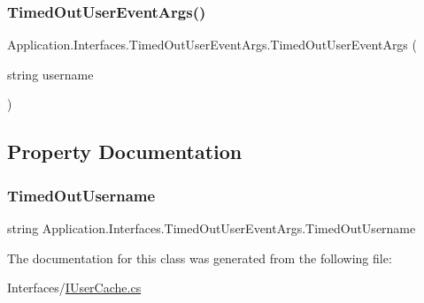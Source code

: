 \subsubsection{\texorpdfstring{Timed\+Out\+User\+Event\+Args()}{TimedOutUserEventArgs()}}
{\footnotesize\ttfamily Application.\+Interfaces.\+Timed\+Out\+User\+Event\+Args.\+Timed\+Out\+User\+Event\+Args (\begin{DoxyParamCaption}\item[{string}]{username }\end{DoxyParamCaption})}



\subsection{Property Documentation}
\mbox{\label{class_application_1_1_interfaces_1_1_timed_out_user_event_args_ad359e7a3cc388ea94e1332e9109cebf8}} 
\subsubsection{\texorpdfstring{Timed\+Out\+Username}{TimedOutUsername}}
{\footnotesize\ttfamily string Application.\+Interfaces.\+Timed\+Out\+User\+Event\+Args.\+Timed\+Out\+Username\hspace{0.3cm}{\ttfamily [get]}}



The documentation for this class was generated from the following file\+:\begin{DoxyCompactItemize}
\item 
Interfaces/\mbox{\hyperlink{_i_user_cache_8cs}{I\+User\+Cache.\+cs}}\end{DoxyCompactItemize}
